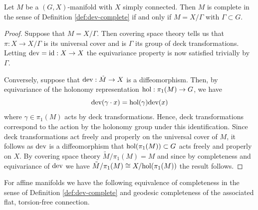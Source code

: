 \begin{prop}\label{prop:complete-if-quotient}
    Let $M$ be a $(G,X)$-manifold with $X$ simply connected. Then $M$ is complete in the sense of Definition \ref{def:dev-complete}
    if and only if $M = X/ \Gamma$ with $\Gamma \subset G$.
\end{prop}
\begin{proof}
    Suppose that $M = X/ \Gamma$. Then covering space theory tells us that $\pi: X \to X / \Gamma$  is its universal cover and is $\Gamma$ its group of deck transformations.
    Letting $\text{dev} = \text{id} : X \to X$ the equivariance property is now satisfied trivially by $\Gamma$.

    Conversely, suppose that $\text{dev} : \tilde{M} \to X$ is a diffeomorphism. Then, by
    equivariance of the holonomy representation $\text{hol}: \pi_1(M) \to G$, we have $$
        \text{dev}(\gamma \cdot x) = \text{hol}(\gamma) \text{dev}(x) $$ where $\gamma \in \pi_1(M)$ acts
    by deck transformations. Hence, deck transformations correspond to the action
    by the holonomy group under this identification. Since deck transformations act
    freely and properly on the universal cover of $M$, it follows as $\text{dev}$ is a
    diffeomorphism that $\text{hol} (\pi_1(M)) \subset G$ acts freely and properly on
    $X$. By covering space theory $\tilde{M}/ \pi_1(M) = M$ and since by
    completeness and equivariance of $\text{dev}$ we have $\tilde{M}/ \pi_1(M) \cong X /
        \text{hol} (\pi_1(M))$ the result follows.
\end{proof}

For affine manifolds we have the following equivalence of completeness in the
sense of Definition \ref{def:dev-complete} and geodesic completeness of the
associated flat, torsion-free connection.

